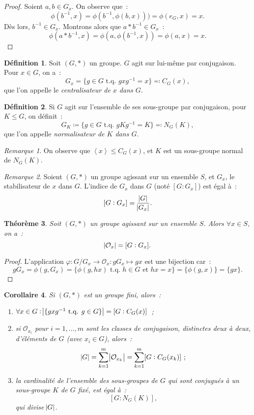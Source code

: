 \documentclass{article}
\newtheorem{thm}{Théorème}[section]
\newtheorem{cor}[thm]{Corollaire}
\theoremstyle{definition}
\newtheorem{déf}[thm]{Définition}
\theoremstyle{remark}
\newtheorem*{rmq}{Remarque}
\newcommand{\tq}{\text{ t.q. }}
\newcommand{\eng}[1]{\left\langle#1\right\rangle}
\begin{document}
	\begin{proof} Soient $a, b \in G_x$. On observe que~:
	\[\phi(b^{-1}, x) = \phi(b^{-1}, \phi(b, x))) = \phi(e_G, x) = x.\]
	Dès lors, $b^{-1} \in G_x$. Montrons alors que $a*b^{-1} \in G_x$~:
	\[\phi(a*b^{-1}, x) = \phi(a, \phi(b^{-1}, x)) = \phi(a, x) = x.\]
	\end{proof}

	\begin{déf} Soit $(G, *)$ un groupe. $G$ agit sur lui-même par conjugaison. Pour $x \in G$, on a~:
	\[G_x = \{g \in G \tq gxg^{-1} = x\} \eqqcolon C_G(x),\]
	que l'on appelle le \textit{centralisateur de $x$ dans $G$}.
	\end{déf}

	\begin{déf} Si $G$ agit sur l'ensemble de ses sous-groupe par conjugaison, pour $K \leq G$, on définit~:
	\[G_K \coloneqq \{g \in G \tq gKg^{-1} = K\} \eqqcolon N_G(K),\]
	que l'on appelle \textit{normalisateur de $K$ dans $G$}.
	\end{déf}

	\begin{rmq} On observe que $\eng x \leq C_G(x)$, et $K$ est un sous-groupe normal de $N_G(K)$.
	\end{rmq}

	\begin{rmq} Soient $(G, *)$ un groupe agissant sur un ensemble $S$, et $G_x$, le stabilisateur de $x$ dans $G$. L'indice de $G_x$ dans $G$ (noté $[G:G_x]$)
	est égal à~:
	\[[G:G_x] = \frac {\abs G}{\abs {G_x}}.\]
	\end{rmq}

	\begin{thm} Soit $(G, *)$ un groupe agissant sur un ensemble $S$. Alors $\forall x \in S$, on a~:
	\[\abs {\mathcal O_x} = [G:G_x].\]
	\end{thm}

	\begin{proof} L'application $\varphi : G/G_x \to \mathcal O_x : gG_x \mapsto gx$ est une bijection car~:
	\[gG_x = \phi(g, G_x) = \{\phi(g, hx) \tq h \in G \text{ et } hx = x\} = \{\phi(g, x)\} = \{gx\}.\]
	\end{proof}

	\begin{cor} Si $(G, *)$ est un groupe fini, alors~:
	\begin{enumerate}
		\item $\forall x \in G : \abs {\{gxg^{-1} \tq g \in G\}} = [G:C_G(x)]$~;
		\item si $\mathcal O_{x_i}$ pour $i=1, \ldots, m$ sont les classes de conjugaison, distinctes deux à deux, d'éléments de $G$ (avec $x_i \in G$), alors~:
		\[\abs G = \sum_{k=1}^m\abs {\mathcal O_{x_k}} = \sum_{k=1}^m[G:C_G(x_k)]~;\]
		\item la cardinalité de l'ensemble des sous-groupes de $G$ qui sont conjugués à un sous-groupe $K$ de $G$ fixé, est égal à~:
		\[[G:N_G(K)],\]
		qui divise $\abs G$.
	\end{enumerate}
	\end{cor}
\end{document}
